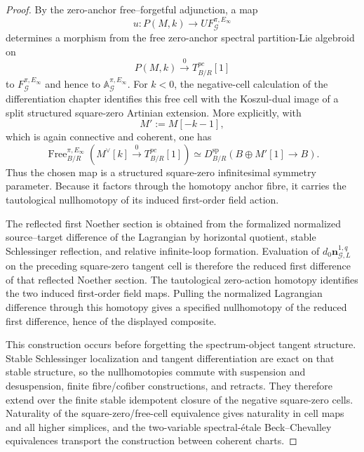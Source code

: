 \begin{proof}
By the zero-anchor free--forgetful adjunction, a map
\[
u:P(M,k)\longrightarrow UF_{\mathcal G}^{\pi,E_\infty}
\]
determines a morphism from the free zero-anchor spectral partition-Lie algebroid
on
\[
P(M,k)\xrightarrow{0}T_{B/R}^{pc}[1]
\]
to $F_{\mathcal G}^{\pi,E_\infty}$ and hence to
$\mathbb A_{\mathcal G}^{\pi,E_\infty}$.  For $k<0$, the negative-cell
calculation of the differentiation chapter identifies this free cell with the
Koszul-dual image of a split structured square-zero Artinian extension.  More
explicitly, with
\[
M':=M[-k-1],
\]
which is again connective and coherent, one has
\[
\operatorname{Free}_{B/R}^{\pi,E_\infty}
\left(M^\vee[k]\xrightarrow0T_{B/R}^{pc}[1]\right)
\simeq
D_{B/R}^{\mathrm{sp}}
\left(B\oplus M'[1]\longrightarrow B\right).
\]
Thus the chosen map is a structured square-zero infinitesimal symmetry parameter.
Because it factors through the homotopy anchor fibre, it carries the tautological
nullhomotopy of its induced first-order field action.

The reflected first Noether section is obtained from the formalized normalized
source--target difference of the Lagrangian by horizontal quotient, stable
Schlessinger reflection, and relative infinite-loop formation.  Evaluation of
$d_0\mathbf n_{\mathcal G,L}^{1,q}$ on the preceding square-zero tangent cell is
therefore the reduced first difference of that reflected Noether section.  The
tautological zero-action homotopy identifies the two induced first-order field
maps.  Pulling the normalized Lagrangian difference through this homotopy gives a
specified nullhomotopy of the reduced first difference, hence of the displayed
composite.

This construction occurs before forgetting the spectrum-object tangent structure.
Stable Schlessinger localization and tangent differentiation are exact on that
stable structure, so the nullhomotopies commute with suspension and desuspension,
finite fibre/cofiber constructions, and retracts.  They therefore extend over the
finite stable idempotent closure of the negative square-zero cells.  Naturality of
the square-zero/free-cell equivalence gives naturality in cell maps and all higher
simplices, and the two-variable spectral-\'etale Beck--Chevalley equivalences
transport the construction between coherent charts.
\end{proof}

